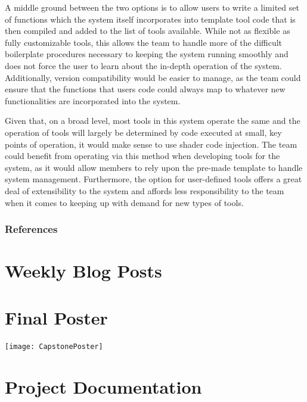 \documentclass[onecolumn, draftclsnofoot,10pt, compsoc]{IEEEtran}
\newcounter{threesection}[subsubsection]
\begin{document}

A middle ground between the two options is to allow users to write a limited set of functions which the system itself incorporates into template tool code that is then compiled and added to the list of tools available.
While not as flexible as fully customizable tools, this allows the team to handle more of the difficult boilerplate procedures necessary to keeping the system running smoothly and does not force the user to learn about the in-depth operation of the system.
Additionally, version compatibility would be easier to manage, as the team could ensure that the functions that users code could always map to whatever new functionalities are incorporated into the system.




Given that, on a broad level, most tools in this system operate the same and the operation of tools will largely be determined by code executed at small, key points of operation, it would make sense to use shader code injection.
The team could benefit from operating via this method when developing tools for the system, as it would allow members to rely upon the pre-made template to handle system management.
Furthermore, the option for user-defined tools offers a great deal of extensibility to the system and affords less responsibility to the team when it comes to keeping up with demand for new types of tools.
\pagebreak
\subsubsection{References}

{}


\section{Weekly Blog Posts}




\section{Final Poster}
\texttt{[image: CapstonePoster]}


\section{Project Documentation}
\end{document}
